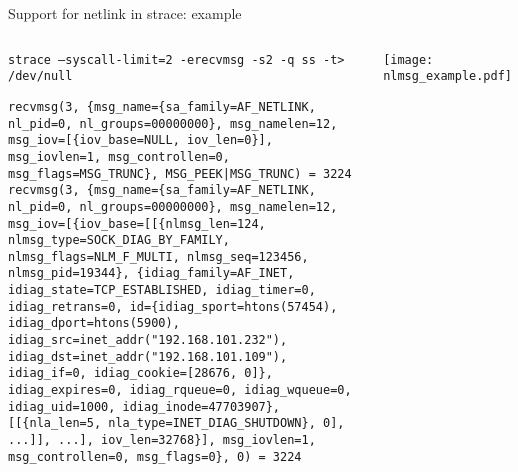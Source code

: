 \documentclass[unicode,aspectratio=169]{beamer}
\begin{document}
\begin{frame}[fragile]{Support for netlink in strace: example}
\begin{columns}
\column{10cm}
\begin{block}{\scriptsize\texttt{strace --syscall-limit=2 -erecvmsg -s2 -q ss -t> /dev/null}}
\begin{scriptsize}
\begin{lstlisting}
recvmsg(3, {msg_name={sa_family=AF_NETLINK, nl_pid=0, nl_groups=00000000}, msg_namelen=12, msg_iov=[{iov_base=NULL, iov_len=0}], msg_iovlen=1, msg_controllen=0, msg_flags=MSG_TRUNC}, MSG_PEEK|MSG_TRUNC) = 3224
recvmsg(3, {msg_name={sa_family=AF_NETLINK, nl_pid=0, nl_groups=00000000}, msg_namelen=12, msg_iov=[{iov_base=[[{nlmsg_len=124, nlmsg_type=SOCK_DIAG_BY_FAMILY, nlmsg_flags=NLM_F_MULTI, nlmsg_seq=123456, nlmsg_pid=19344}, {idiag_family=AF_INET, idiag_state=TCP_ESTABLISHED, idiag_timer=0, idiag_retrans=0, id={idiag_sport=htons(57454), idiag_dport=htons(5900), idiag_src=inet_addr("192.168.101.232"), idiag_dst=inet_addr("192.168.101.109"), idiag_if=0, idiag_cookie=[28676, 0]}, idiag_expires=0, idiag_rqueue=0, idiag_wqueue=0, idiag_uid=1000, idiag_inode=47703907}, [[{nla_len=5, nla_type=INET_DIAG_SHUTDOWN}, 0], ...]], ...], iov_len=32768}], msg_iovlen=1, msg_controllen=0, msg_flags=0}, 0) = 3224
\end{lstlisting}
\end{scriptsize}
\end{block}
\column{4cm}
{\centerline{\texttt{[image: nlmsg\_example.pdf]}}}
\end{columns}
\end{frame}
\end{document}
